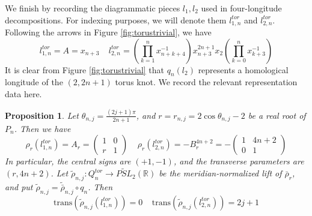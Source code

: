 \documentclass{article}
\theoremstyle{plain}
\theoremstyle{definition}
\theoremstyle{plain}
\newtheorem{prop}[theorem]{Proposition}
\theoremstyle{plain}
\theoremstyle{plain}
\theoremstyle{remark}
\theoremstyle{remark}
\theoremstyle{plain}
\theoremstyle{plain}
\theoremstyle{plain}
\theoremstyle{plain}
\begin{document}
We finish by recording the diagrammatic pieces $l_1, l_2$ used in four-longitude decompositions. For indexing purposes, we will denote them $l_{1,n}^{tor}$ and $l_{2,n}^{tor}$. Following the arrows in Figure \ref{fig:torustrivial}, we have 
\begin{equation*}
	l_{1,n}^{tor} = A = x_{n+3} \ \ \ \ \ l_{2,n}^{tor} = \left(\prod_{k=1}^nx_{n+k+4}^{-1}\right)x_{n+3}^{2n+1}x_2\left(\prod_{k=0}^nx_{k+3}^{-1}\right)
\end{equation*}
It is clear from Figure \ref{fig:torustrivial} that $q_n(l_2)$ represents a homological longitude of the $(2,2n+1)$ torus knot. We record the relevant representation data here. 

\begin{prop}\label{prop:torus-heights}
Let $\theta_{n,j} = \frac{(2j+1)\pi}{2n+1}$, and $r=r_{n,j} = 2\cos\theta_{n,j}-2$ be a real root of $P_n$. Then we have
\begin{equation*}
	\rho_r(l_{1,n}^{tor}) = A_r = \begin{pmatrix}1&0 \\r&1\end{pmatrix} \ \ \ \ \ \rho_r(l_{2,n}^{tor}) = -B_r^{4n+2} = -\begin{pmatrix}1&4n+2\\0&1\end{pmatrix}
\end{equation*}
In particular, the central signs are $(+1, -1)$, and the transverse parameters are $(r, 4n+2)$. Let $\widetilde\rho_{n,j}: Q_n^{tor} \to \widetilde{PSL}_2(\mathbb R)$ be the meridian-normalized lift of $\bar\rho_r$, and put $\widetilde\rho_{n,j} = \widetilde{\bar\rho}_{n,j} \circ q_n$. Then
\begin{equation*}
	\mathrm{trans}(\widetilde\rho_{n,j}(l_{1,n}^{tor})) = 0 \ \ \ \ \ \mathrm{trans}(\widetilde\rho_{n,j}(l_{2,n}^{tor})) = 2j+1
\end{equation*}
\end{prop}
\end{document}
